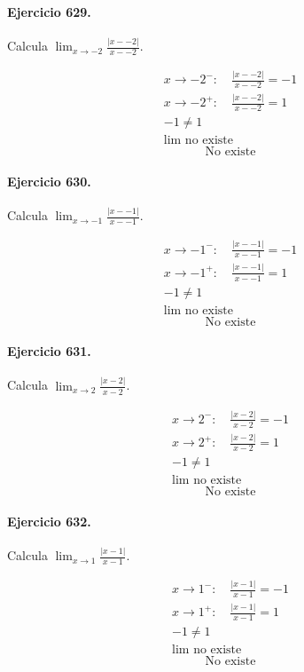\documentclass[11pt,a4paper]{article}
\begin{document}
\paragraph{Ejercicio 629.} Calcula $\displaystyle\lim_{x\to -2}\frac{|x--2|}{x--2}$. 

\[
\begin{aligned}
x\to -2^-:\quad \frac{|x--2|}{x--2}=-1\\
x\to -2^+:\quad \frac{|x--2|}{x--2}=1\\
-1\ne1\\
\lim\text{{ no existe}}
\end{aligned}
\]
\[\boxed{\text{{No existe}}}\]


\paragraph{Ejercicio 630.} Calcula $\displaystyle\lim_{x\to -1}\frac{|x--1|}{x--1}$. 

\[
\begin{aligned}
x\to -1^-:\quad \frac{|x--1|}{x--1}=-1\\
x\to -1^+:\quad \frac{|x--1|}{x--1}=1\\
-1\ne1\\
\lim\text{{ no existe}}
\end{aligned}
\]
\[\boxed{\text{{No existe}}}\]


\paragraph{Ejercicio 631.} Calcula $\displaystyle\lim_{x\to 2}\frac{|x-2|}{x-2}$. 

\[
\begin{aligned}
x\to 2^-:\quad \frac{|x-2|}{x-2}=-1\\
x\to 2^+:\quad \frac{|x-2|}{x-2}=1\\
-1\ne1\\
\lim\text{{ no existe}}
\end{aligned}
\]
\[\boxed{\text{{No existe}}}\]


\paragraph{Ejercicio 632.} Calcula $\displaystyle\lim_{x\to 1}\frac{|x-1|}{x-1}$. 

\[
\begin{aligned}
x\to 1^-:\quad \frac{|x-1|}{x-1}=-1\\
x\to 1^+:\quad \frac{|x-1|}{x-1}=1\\
-1\ne1\\
\lim\text{{ no existe}}
\end{aligned}
\]
\[\boxed{\text{{No existe}}}\]
\end{document}
